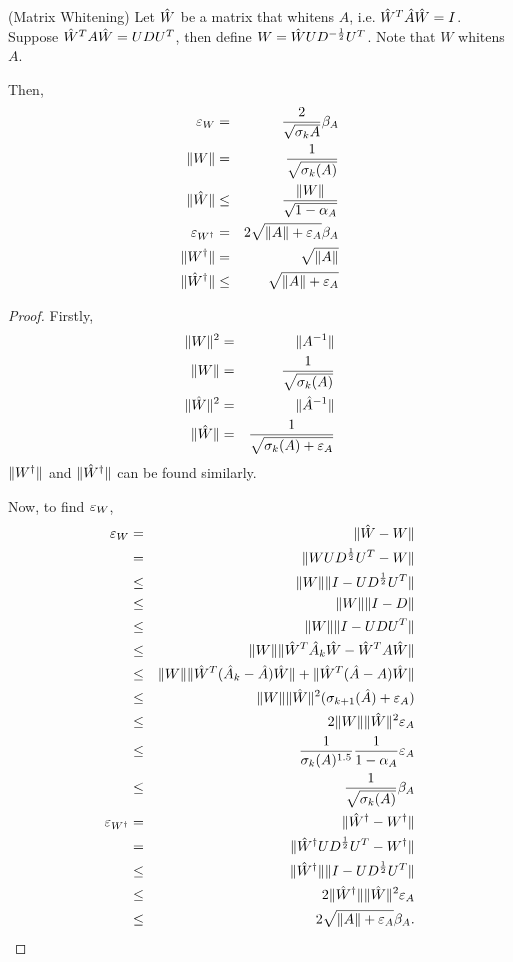 \begin{proposition}(Matrix Whitening)
  \label{prop:white}
  Let $\hat{W}$ be a matrix that whitens $A$, i.e. $\hat{W}^T \hat{A} \hat{W} = I$.
  Suppose $\hat{W}^T A \hat{W} = U D U^T$, then define $W = \hat{W} U D^{-\frac{1}{2}}
  U^T$. Note that $W$ whitens $A$. 

  Then, 
  \begin{eqnarray}
    \varepsilon_{W} &=& \frac{2}{\sqrt{\sigma_k{A}}} \beta_{A} \\
    \| W \| &=& \frac{1}{\sqrt{\sigma_k(A)}} \\
    \| \hat{W} \| &\le& \frac{\|W\|}{\sqrt{1 - \alpha_{A}}} \\
    \varepsilon_{W^{\dagger}} &=& 2 \sqrt{\|A\| + \varepsilon_{A}} \beta_{A} \\
    \| W^{\dagger} \| &=& \sqrt{\|A\|} \\
    \| \hat{W}^{\dagger} \| &\le& \sqrt{\|A\| + \varepsilon_{A}}
  \end{eqnarray}
\end{proposition}
\begin{proof}
  Firstly, 
  \begin{eqnarray}
    \| W \|^2 &=& \| A^{-1} \| \\
    \| W \| &=& \frac{1}{\sqrt{\sigma_k(A)}} \\
    \| \hat{W} \|^2 &=& \| \hat{A}^{-1} \| \\
    \| \hat{W} \| &=& \frac{1}{\sqrt{\sigma_k(A) + \varepsilon_{A}}}
  \end{eqnarray}
  $\| W^{\dagger} \|$ and $\| \hat{W}^{\dagger} \|$ can be found similarly.

  Now, to find $\varepsilon_{W}$,
  \begin{eqnarray}
    \varepsilon_{W} &=& \| \hat{W} - W \| \\
    &=& \| W U D^{\frac{1}{2}} U^T - W \| \\
    &\le& \|W\| \| I - U D^{\frac{1}{2}} U^T \| \\
    &\le& \|W\| \| I - D \| \\
    &\le& \|W\| \| I - U D U^T \| \\
    &\le& \|W\| \| \hat{W}^T \hat{A}_k \hat{W} - \hat{W}^T A \hat{W} \| \\
    &\le& \|W\| \| \hat{W}^T (\hat{A}_k - \hat{A}) \hat{W} \| + \| \hat{W}^T (\hat{A} - A) \hat{W} \| \\
    &\le& \|W\| \|\hat{W}\|^2 (\sigma_{k+1}(\hat{A}) + \varepsilon_{A}) \\
    &\le& 2 \|W\| \|\hat{W}\|^2 \varepsilon_{A} \\
    &\le& \frac{1}{\sigma_k(A)^{1.5}} \frac{1}{1 - \alpha_{A}} \varepsilon_{A} \\
    &\le& \frac{1}{\sqrt{\sigma_k(A)}} \beta_{A} \\
    \varepsilon_{W^{\dagger}} &=& \| \hat{W}^{\dagger} - W^{\dagger} \| \\
    &=& \| \hat{W}^{\dagger} U D^{\frac{1}{2}} U^T - W^{\dagger} \| \\
    &\le& \|\hat{W}^{\dagger}\| \| I - U D^{\frac{1}{2}} U^T \| \\
    &\le& 2 \|\hat{W}^{\dagger}\| \|\hat{W}\|^2 \varepsilon_{A} \\
    &\le& 2 \sqrt{\|A\| + \varepsilon_{A}} \beta_{A}.
  \end{eqnarray}

\end{proof}

